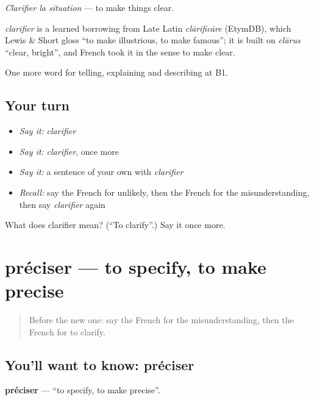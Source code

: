 \emph{Clarifier la situation} — to make things clear.

\begin{cousinweb}
\emph{clarifier} is a learned borrowing from Late Latin \emph{clārificāre} (EtymDB), which Lewis \& Short gloss \textquotedblleft{}to make illustrious, to make famous\textquotedblright{}; it is built on \emph{clārus} \textquotedblleft{}clear, bright\textquotedblright{}, and French took it in the sense to make clear.
\end{cousinweb}

\begin{grammarlens}[title={What you've built}]
One more word for telling, explaining and describing at B1.
\end{grammarlens}

\subsection*{Your turn}
\begin{itemize}
\raggedright
  \item \emph{Say it:} \emph{clarifier}
  \item \emph{Say it:} \emph{clarifier}, once more
  \item \emph{Say it:} a sentence of your own with \emph{clarifier}
  \item \emph{Recall:} say the French for unlikely, then the French for the misunderstanding, then say \emph{clarifier} again
\end{itemize}

\begin{tcolorbox}[breakable,colback=teal!4,colframe=teal!35!black,title={Before you move on}]
What does clarifier mean? (\textquotedblleft{}To clarify\textquotedblright{}.) Say it once more.
\end{tcolorbox}
\section[préciser]{préciser — to specify, to make precise}

\label{lesson:FR-C341-preciser}



\begin{quote}
Before the new one: say the French for the misunderstanding, then the French for to clarify.
\end{quote}

\subsection*{You'll want to know: préciser}
\textbf{préciser} — \textquotedblleft{}to specify, to make precise\textquotedblright{}.


